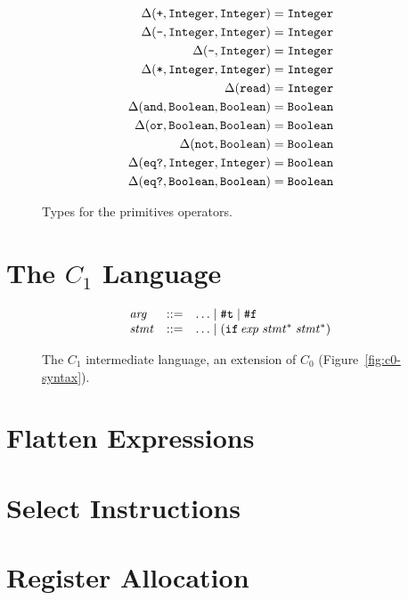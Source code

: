 \documentclass[12pt]{book}
\begin{document}
\begin{figure}

\begin{align*}
\Delta(\texttt{+},\texttt{Integer},\texttt{Integer}) &= \texttt{Integer} \\
\Delta(\texttt{-},\texttt{Integer},\texttt{Integer}) &= \texttt{Integer} \\
\Delta(\texttt{-},\texttt{Integer}) &= \texttt{Integer} \\
\Delta(\texttt{*},\texttt{Integer},\texttt{Integer}) &= \texttt{Integer} \\
\Delta(\texttt{read}) &= \texttt{Integer} \\
\Delta(\texttt{and},\texttt{Boolean},\texttt{Boolean}) &= \texttt{Boolean} \\
\Delta(\texttt{or},\texttt{Boolean},\texttt{Boolean}) &= \texttt{Boolean} \\
\Delta(\texttt{not},\texttt{Boolean}) &= \texttt{Boolean} \\
\Delta(\texttt{eq?},\texttt{Integer},\texttt{Integer}) &= \texttt{Boolean} \\
\Delta(\texttt{eq?},\texttt{Boolean},\texttt{Boolean}) &= \texttt{Boolean} 
\end{align*}

\caption{Types for the primitives operators.}
\end{figure}


\section{The $C_1$ Language}

\begin{figure}[htbp]
\[
\begin{array}{lcl}
\mathit{arg} &::=& \ldots \mid \texttt{\#t} \mid \texttt{\#f} \\
\mathit{stmt} &::=& \ldots \mid (\texttt{if}\,\mathit{exp}\;\mathit{stmt}^{*}\;\mathit{stmt}^{*}) 
\end{array}
\]
\caption{The $C_1$ intermediate language, an extension of $C_0$
  (Figure~\ref{fig:c0-syntax}).}
\label{fig:c1-syntax}
\end{figure}

\section{Flatten Expressions}

\section{Select Instructions}

\section{Register Allocation}
\end{document}

